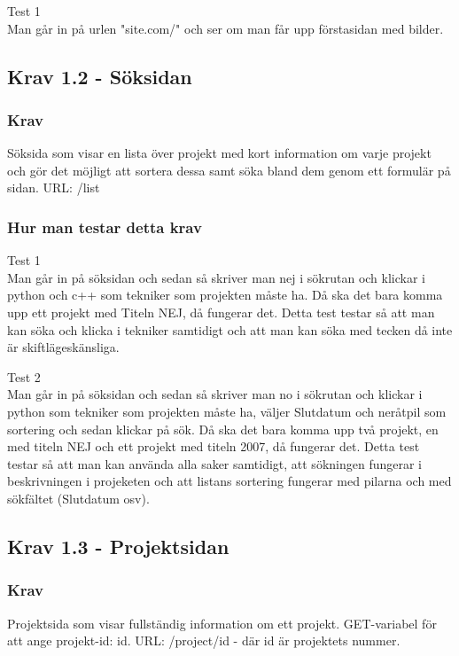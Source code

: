 \documentclass{TDP003mall}
\begin{document}
        Test 1\\
        Man går in på urlen "site.com/" och ser om man får upp förstasidan med bilder.
    
    \subsection{Krav 1.2 - Söksidan}
    
        \subsubsection{Krav}
        Söksida som visar en lista över projekt med kort information om varje
        projekt och gör det möjligt att sortera dessa samt söka bland dem genom
        ett formulär på sidan. URL: /list
    
        \subsubsection{Hur man testar detta krav}
        
        Test 1\\
        Man går in på söksidan och sedan så skriver man nej i sökrutan och klickar i python och c++ som tekniker som projekten måste ha. Då ska det bara komma upp ett projekt med Titeln NEJ, då fungerar det. Detta test testar så att man kan söka och klicka i tekniker samtidigt och att man kan söka med tecken då inte är skiftlägeskänsliga.
        
        Test 2\\
        Man går in på söksidan och sedan så skriver man no i sökrutan och klickar i python som tekniker som projekten måste ha, väljer Slutdatum och neråtpil som sortering och sedan klickar på sök. Då ska det bara komma upp två projekt, en med titeln NEJ och ett projekt med titeln 2007, då fungerar det. Detta test testar så att man kan använda alla saker samtidigt, att sökningen fungerar i beskrivningen i projeketen och att listans sortering fungerar med pilarna och med sökfältet (Slutdatum osv).
    
    \subsection{Krav 1.3 - Projektsidan}
    
        \subsubsection{Krav}
        Projektsida som visar fullständig information om ett projekt. GET-variabel
        för att ange projekt-id: id. URL: /project/id - där id är projektets
        nummer.
    
\end{document}
